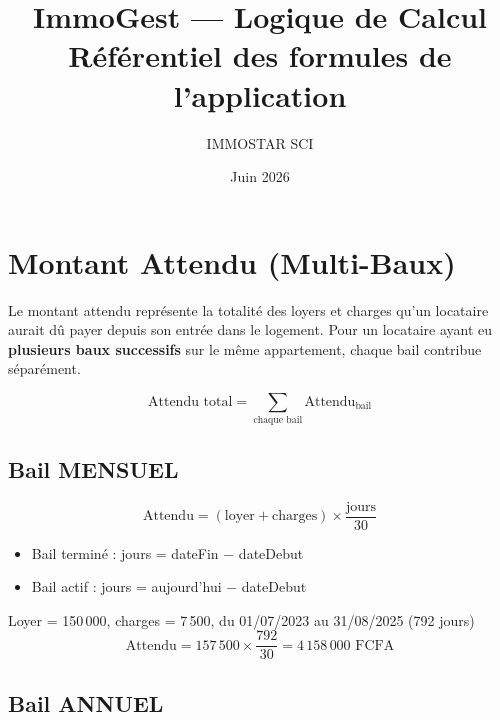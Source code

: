 \documentclass[a4paper,12pt]{article}
\title{\vspace{-1cm}\textbf{\LARGE ImmoGest — Logique de Calcul} \\ \large Référentiel des formules de l'application}
\author{IMMOSTAR SCI}
\date{Juin 2026}
\begin{document}
\maketitle
\tableofcontents
\newpage

\section{Montant Attendu (Multi-Baux)}

Le montant attendu représente la totalité des loyers et charges qu'un locataire aurait dû payer depuis son entrée dans le logement. Pour un locataire ayant eu \textbf{plusieurs baux successifs} sur le même appartement, chaque bail contribue séparément.

\begin{formulebox}
\begin{equation}
\text{Attendu total} = \sum_{\text{chaque bail}} \text{Attendu}_{\text{bail}}
\end{equation}
\end{formulebox}

\subsection{Bail MENSUEL}

\begin{formulebox}
\begin{equation}
\text{Attendu} = (\text{loyer} + \text{charges}) \times \frac{\text{jours}}{30}
\end{equation}
\vspace{-0.3cm}
\begin{itemize}[noitemsep]
  \item Bail terminé : jours = dateFin $-$ dateDebut
  \item Bail actif : jours = aujourd'hui $-$ dateDebut
\end{itemize}
\end{formulebox}

\begin{exemplebox}
Loyer = 150\,000, charges = 7\,500, du 01/07/2023 au 31/08/2025 (792 jours)
$$\text{Attendu} = 157\,500 \times \frac{792}{30} = 4\,158\,000 \text{ FCFA}$$
\end{exemplebox}

\subsection{Bail ANNUEL}
\end{document}
